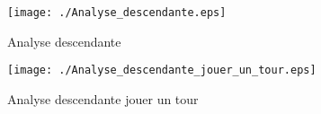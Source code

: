 \begin{figure}[ht]
  \centering
  \texttt{[image: ./Analyse\_descendante.eps]}
  \caption{Analyse descendante}
  \texttt{[image: ./Analyse\_descendante\_jouer\_un\_tour.eps]}
  \caption{Analyse descendante jouer un tour}
\end{figure}
